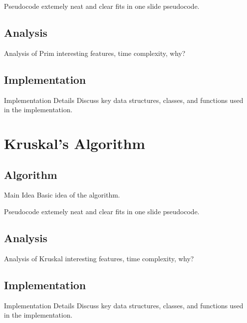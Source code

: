 \documentclass{beamer}
\begin{document}
\begin{frame}{Pseudocode}
    extemely neat and clear fits in one slide pseudocode.
\end{frame}

\subsection{Analysis}
\begin{frame}{Analysis of Prim}
    interesting features, time complexity, why?
\end{frame}

\subsection{Implementation}
\begin{frame}{Implementation Details}
    Discuss key data structures, classes, and functions used in the
    implementation.
\end{frame}


\section{Kruskal's Algorithm}\frame{\sectionpage}
\subsection{Algorithm}
\begin{frame}{Main Idea}
    Basic idea of the algorithm.
\end{frame}

\begin{frame}{Pseudocode}
    extemely neat and clear fits in one slide pseudocode.
\end{frame}

\subsection{Analysis}
\begin{frame}{Analysis of Kruskal}
    interesting features, time complexity, why?
\end{frame}

\subsection{Implementation}
\begin{frame}{Implementation Details}
    Discuss key data structures, classes, and functions used in the
    implementation.
\end{frame}
\end{document}
